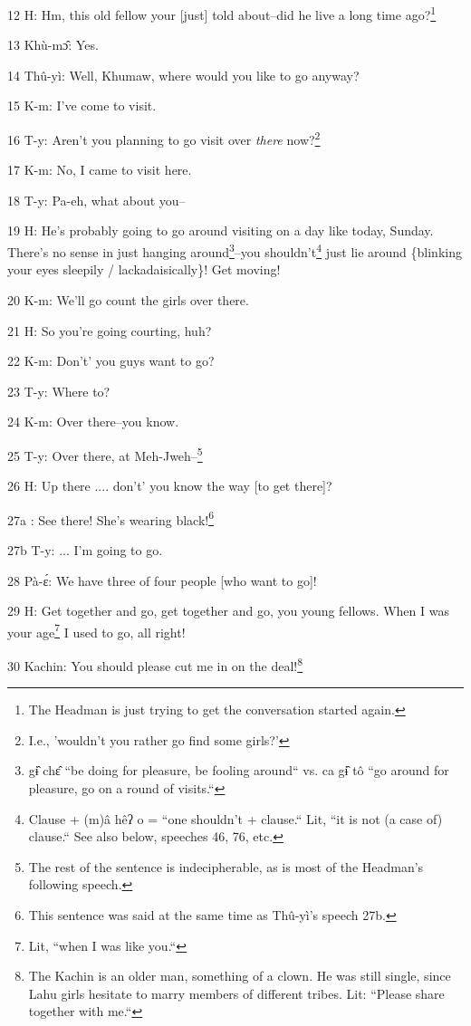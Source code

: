 
12 H: Hm, this old fellow your [just] told about--did he live a long time ago?\footnote{The Headman is just trying to get the conversation started again.}

13 Khù-mɔ̂: Yes.

14 Thû-yì: Well, Khumaw, where would you like to go anyway?

15 K-m: I've come to visit.

16 T-y: Aren't you planning to go visit over \textit{there} now?\footnote{I.e., 'wouldn't you rather go find some girls?'}

17 K-m: No, I came to visit here.

18 T-y: Pa-eh, what about you--

19 H: He's probably going to go around visiting on a day like today, Sunday. There's
no sense in just hanging around\footnote{gɨ̂ chɛ̂ ``be doing for pleasure, be fooling around`` vs. ca gɨ̂ tô ``go around for pleasure, go on a round of visits.``}--you shouldn't\footnote{Clause + (m)â hêʔ o =  ``one shouldn't + clause.`` Lit, ``it is not (a case of) clause.`` See also below, speeches 46, 76, etc.} just lie around \{blinking
your eyes sleepily / lackadaisically\}! Get moving!

20 K-m: We'll go count the girls over there.

21 H: So you're going courting, huh?

22 K-m: Don't' you guys want to go?

23 T-y: Where to?

24 K-m: Over there--you know.

25 T-y: Over there, at Meh-Jweh--\footnote{The rest of the sentence is indecipherable, as is most of the Headman's following speech.}

26 H: Up there .... don't' you know the way [to get there]?

27a  : See there! She's wearing black!\footnote{This sentence was said at the same time as Thû-yì's speech 27b.}

27b T-y: ... I'm going to go.

28 Pà-ɛ́: We have three of four people [who want to go]!

29 H: Get together and go, get together and go, you young fellows. When I was your
age\footnote{Lit, ``when I was like you.``} I used to go, all right!

30 Kachin: You should please cut me in on the deal!\footnote{The Kachin is an older man, something of a clown. He was still single, since Lahu girls hesitate to marry members of different tribes. Lit: ``Please share together with me.``}


